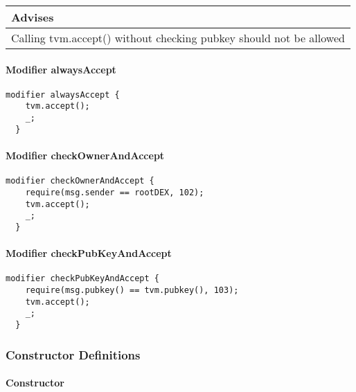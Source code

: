 \ifsoldraft
\noindent\begin{tabular}{|p{12cm}|}\hline
\rowcolor{green}Advises
\\\hline
Calling tvm.accept() without checking pubkey should not be allowed
\\\hline\end{tabular}
\fi

\paragraph{Modifier alwaysAccept}


\begin{lstlisting}[firstnumber=71]
  modifier alwaysAccept {
    tvm.accept();
    _;
  }
\end{lstlisting}

\paragraph{Modifier checkOwnerAndAccept}


\begin{lstlisting}[firstnumber=76]
  modifier checkOwnerAndAccept {
    require(msg.sender == rootDEX, 102);
    tvm.accept();
    _;
  }
\end{lstlisting}

\paragraph{Modifier checkPubKeyAndAccept}


\begin{lstlisting}[firstnumber=82]
  modifier checkPubKeyAndAccept {
    require(msg.pubkey() == tvm.pubkey(), 103);
    tvm.accept();
    _;
  }
\end{lstlisting}

\subsubsection{Constructor Definitions}


\paragraph{Constructor}


